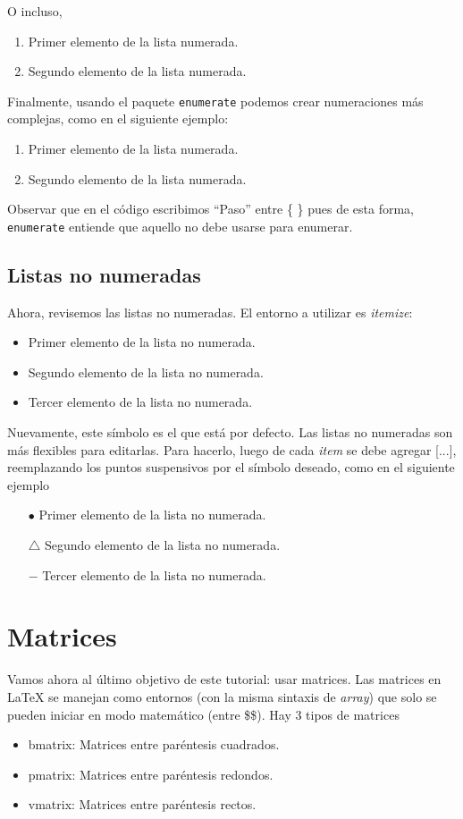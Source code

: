 \documentclass{article}
\begin{document}
O incluso,
	\begin{enumerate}[\bf a)]
		\item Primer elemento de la lista numerada.
		\item Segundo elemento de la lista numerada.		
	\end{enumerate}

Finalmente, usando el paquete \texttt{enumerate} podemos crear numeraciones más complejas, como en el siguiente ejemplo:
	\begin{enumerate}[\bf {Paso} 1)]
		\item Primer elemento de la lista numerada.
		\item Segundo elemento de la lista numerada.		
	\end{enumerate}

Observar que en el código escribimos ``Paso'' entre \{ \} pues de esta forma, \texttt{enumerate} entiende que aquello no debe usarse para enumerar.

\subsection*{Listas no numeradas}
Ahora, revisemos las listas no numeradas. El entorno a utilizar es \textit{itemize}:
	\begin{itemize}
		\item Primer elemento de la lista no numerada.
		\item Segundo elemento de la lista no numerada.
		\item Tercer elemento de la lista no numerada.
	\end{itemize}

Nuevamente, este símbolo es el que está por defecto. Las listas no numeradas son más flexibles para editarlas. Para hacerlo, luego de cada \textit{item} se debe agregar [...], reemplazando los puntos suspensivos por el símbolo deseado, como en el siguiente ejemplo 
	\begin{itemize}
		\item[$\bullet$] Primer elemento de la lista no numerada.
		\item[$\triangle$] Segundo elemento de la lista no numerada.
		\item[$-$] Tercer elemento de la lista no numerada.
	\end{itemize}
	
\section*{Matrices}
Vamos ahora al último objetivo de este tutorial: usar matrices. Las matrices en LaTeX se manejan como entornos (con la misma sintaxis de \textit{array}) que solo se pueden iniciar en modo matemático (entre \$\$). Hay 3 tipos de matrices
	\begin{itemize}
		\item bmatrix: Matrices entre paréntesis cuadrados.
		\item pmatrix: Matrices entre paréntesis redondos.
		\item vmatrix: Matrices entre paréntesis rectos.
	\end{itemize}
\end{document}
